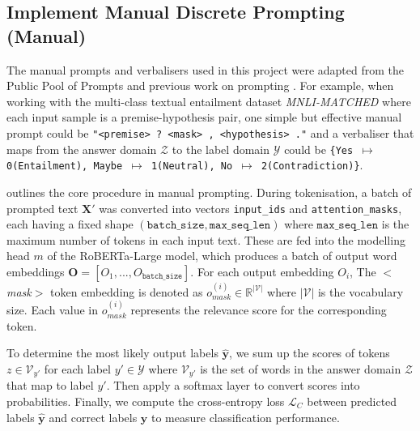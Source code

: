 \subsection{Implement Manual Discrete Prompting (Manual)} \label{sec:manual-prompt}
The manual prompts and verbalisers used in this project were adapted from the Public Pool of Prompts \cite{Bach22OPP} and previous work on prompting \cite{Gao20PM, Lei22}. For example, when working with the multi-class textual entailment dataset \textit{MNLI-MATCHED} where each input sample is a premise-hypothesis pair, one simple but effective manual prompt could be \texttt{"<premise> ? <mask> , <hypothesis> ."} and a verbaliser that maps from the answer domain $\mathcal{Z}$ to the label domain $\mathcal{Y}$ could be \texttt{\{Yes $\mapsto$ 0(Entailment), Maybe $\mapsto$ 1(Neutral), No $\mapsto$ 2(Contradiction)\}}. 

 outlines the core procedure in manual prompting. During tokenisation, a batch of prompted text $\textbf{X}'$ was converted into vectors \texttt{input\_ids} and \texttt{attention\_masks}, each having a fixed shape $(\texttt{batch\_size}, \texttt{max\_seq\_len})$ where $\texttt{max\_seq\_len}$ is the maximum number of tokens in each input text. These are fed into the modelling head $m$ of the RoBERTa-Large model, which produces a batch of output word embeddings $\mathbf{O} = [O_1, ..., O_{\texttt{batch\_size}}]$. For each output embedding $O_i$, The $<$\textit{mask}$>$ token embedding is denoted as $o_{\textit{mask}}^{(i)} \in \mathbb{R}^{|\mathcal{V}|}$ where $|\mathcal{V}|$ is the vocabulary size. Each value in $o_{\textit{mask}}^{(i)}$ represents the relevance score for the corresponding token. 

To determine the most likely output labels $\hat{\textbf{y}}$, we sum up the scores of tokens $z \in \mathcal{V}_{y'}$ for each label $y' \in \mathcal{Y}$ where $\mathcal{V}_{y'}$ is the set of words in the answer domain $\mathcal{Z}$ that map to label $y'$. Then apply a softmax layer to convert scores into probabilities. Finally, we compute the cross-entropy loss $\mathcal{L}_C$ between predicted labels $\hat{\textbf{y}}$ and correct labels $\textbf{y}$ to measure classification performance. 

